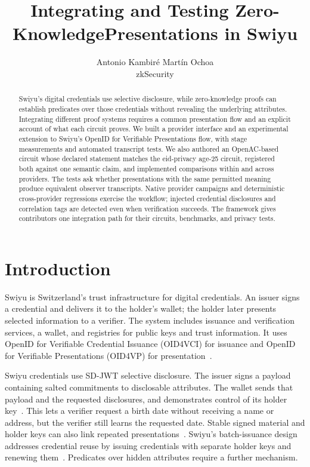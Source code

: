 \documentclass[10pt,twocolumn,letterpaper]{article}
\title{\vspace{-1.5em}Integrating and Testing Zero-Knowledge\newline Presentations in Swiyu}
\author{Antonio Kambir\'e \qquad Mart\'in Ochoa\\zkSecurity}
\date{}
\begin{document}
\maketitle
\begin{abstract}
Swiyu's digital credentials use selective disclosure, while zero-knowledge proofs can establish predicates over those credentials without revealing the underlying attributes. Integrating different proof systems requires a common presentation flow and an explicit account of what each circuit proves. We built a provider interface and an experimental extension to Swiyu's OpenID for Verifiable Presentations flow, with stage measurements and automated transcript tests. We also authored an OpenAC-based circuit whose declared statement matches the eid-privacy age-25 circuit, registered both against one semantic claim, and implemented comparisons within and across providers. The tests ask whether presentations with the same permitted meaning produce equivalent observer transcripts. Native provider campaigns and deterministic cross-provider regressions exercise the workflow; injected credential disclosures and correlation tags are detected even when verification succeeds. The framework gives contributors one integration path for their circuits, benchmarks, and privacy tests.
\end{abstract}

\section{Introduction}
Swiyu is Switzerland's trust infrastructure for digital credentials. An issuer signs a credential and delivers it to the holder's wallet; the holder later presents selected information to a verifier. The system includes issuance and verification services, a wallet, and registries for public keys and trust information. It uses OpenID for Verifiable Credential Issuance (OID4VCI) for issuance and OpenID for Verifiable Presentations (OID4VP) for presentation~\cite{swiyustack}.

Swiyu credentials use SD-JWT selective disclosure. The issuer signs a payload containing salted commitments to disclosable attributes. The wallet sends that payload and the requested disclosures, and demonstrates control of its holder key~\cite{sdjwt,swiyustack}. This lets a verifier request a birth date without receiving a name or address, but the verifier still learns the requested date. Stable signed material and holder keys can also link repeated presentations~\cite{sdjwt}. Swiyu's batch-issuance design addresses credential reuse by issuing credentials with separate holder keys and renewing them~\cite{batch}. Predicates over hidden attributes require a further mechanism.
\end{document}
